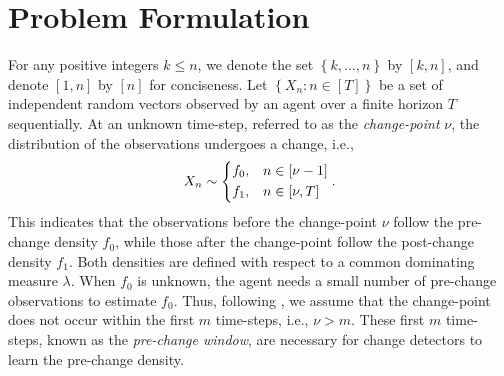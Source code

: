 \documentclass[12pt]{interact}
\newcommand{\lbp}{\left\{}
\newcommand{\rbp}{\right\}}
\newcommand{\lba}{\left\lvert}
\newcommand{\rba}{\right\rvert}
\theoremstyle{plain}
\newcommand{\vvv}[1]{{\color{red}{#1}}}
\newcommand{\yhh}[1]{{\color{purple}{#1}}}
\begin{document}
\section{Problem Formulation}
\label{sec:ProbForm}

For any positive integers $k \leq n$, we denote the set $\lbp k, \dots, n \rbp$ by $[k, n]$, and denote $[1, n]$ by $[n]$ for conciseness. Let $\lbp X_{n}: n \in [T] \rbp$ be a set of independent random vectors observed by an agent over a finite horizon $T$ sequentially. At an unknown time-step, referred to as the \emph{change-point} $\nu$, the distribution of the observations undergoes a change, i.e.,
%
\begin{equation} \label{eq:sample_distr}
    X_{n} \sim \begin{dcases}
        f_{0}, & n \in [\nu - 1] \\
        f_{1}, & n \in [\nu, T]
    \end{dcases}.
\end{equation}
%
This indicates that the observations before the change-point $\nu$ follow the pre-change density $f_{0}$, while those after the change-point follow the post-change density $f_{1}$. Both densities are defined with respect to a common dominating measure $\lambda$. 
When $f_{0}$ is unknown, the agent needs a small number of pre-change observations to estimate $f_{0}$. Thus, following \citep{lai2010sequential}, we assume that the change-point does not occur within the first $m$ time-steps, i.e., $\nu > m$. These first $m$ time-steps, known as the \emph{pre-change window}, are necessary for change detectors to learn the pre-change density.
\end{document}
